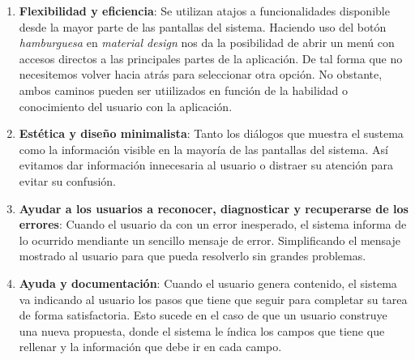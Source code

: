 \begin{enumerate}
  \item \textbf{Flexibilidad y eficiencia}: Se utilizan atajos a funcionalidades disponible desde la mayor parte de las pantallas del sistema. Haciendo uso del botón \textit{hamburguesa} en \textit{material design} nos da la posibilidad de abrir un menú con accesos directos a las principales partes de la aplicación. De tal forma que no necesitemos volver hacia atrás para seleccionar otra opción. No obstante, ambos caminos pueden ser utiilizados en función de la habilidad o conocimiento del usuario con la aplicación.
  \item \textbf{Estética y diseño minimalista}: Tanto los diálogos que muestra el sustema como la información visible en la mayoría de las pantallas del sistema. Así evitamos dar información innecesaria al usuario o distraer su atención para evitar su confusión.
  \item \textbf{Ayudar a los usuarios a reconocer, diagnosticar y recuperarse de los errores}: Cuando el usuario da con un error inesperado, el sistema informa de lo ocurrido mendiante un sencillo mensaje de error. Simplificando el mensaje mostrado al usuario para que pueda resolverlo sin grandes problemas.
  \item \textbf{Ayuda y documentación}: Cuando el usuario genera contenido, el sistema  va indicando al usuario los pasos que tiene que seguir para completar su tarea de forma satisfactoria. Esto sucede en el caso de que un usuario construye una nueva propuesta, donde el sistema le índica los campos que tiene que rellenar y la información que debe ir en cada campo.
\end{enumerate}

